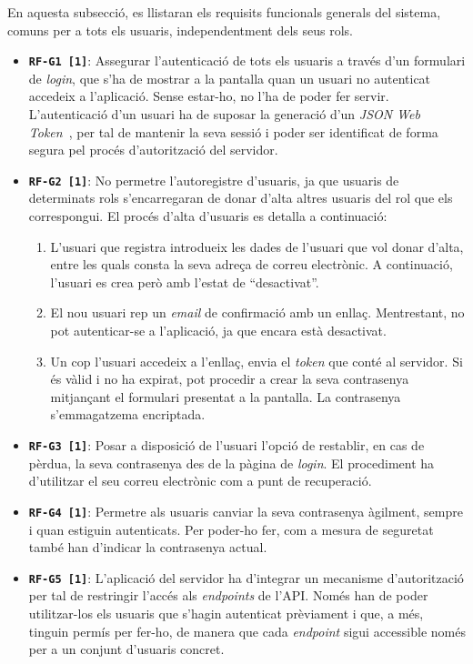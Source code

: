 \documentclass[a4paper,12pt]{ThesisStyle}
\begin{document}
En aquesta subsecció, es llistaran els requisits funcionals generals del sistema, comuns per a tots els usuaris, independentment dels seus rols.

\begin{itemize}
  \item \texttt{\textbf{RF-G1 [1]}}: Assegurar l'autenticació de tots els usuaris a través d'un formulari de \textit{login}, que s'ha de mostrar a la pantalla quan un usuari no autenticat accedeix a l'aplicació. Sense estar-ho, no l'ha de poder fer servir. L'autenticació d'un usuari ha de suposar la generació d'un \textit{JSON Web Token}~\cite{JWT}, per tal de mantenir la seva sessió i poder ser identificat de forma segura pel procés d'autorització del servidor.
  \item \texttt{\textbf{RF-G2 [1]}}: No permetre l'autoregistre d'usuaris, ja que usuaris de determinats rols s'encarregaran de donar d'alta altres usuaris del rol que els correspongui. El procés d'alta d'usuaris es detalla a continuació:
        \begin{enumerate}
          \item L'usuari que registra introdueix les dades de l'usuari que vol donar d'alta, entre les quals consta la seva adreça de correu electrònic. A continuació, l'usuari es crea però amb l'estat de ``desactivat''.
          \item El nou usuari rep un \textit{email} de confirmació amb un enllaç. Mentrestant, no pot autenticar-se a l'aplicació, ja que encara està desactivat.
          \item Un cop l'usuari accedeix a l'enllaç, envia el \textit{token} que conté al servidor. Si és vàlid i no ha expirat, pot procedir a crear la seva contrasenya mitjançant el formulari presentat a la pantalla. La contrasenya s'emmagatzema encriptada.
        \end{enumerate}
  \item \texttt{\textbf{RF-G3 [1]}}: Posar a disposició de l'usuari l'opció de restablir, en cas de pèrdua, la seva contrasenya des de la pàgina de \textit{login}. El procediment ha d'utilitzar el seu correu electrònic com a punt de recuperació.
  \item \texttt{\textbf{RF-G4 [1]}}: Permetre als usuaris canviar la seva contrasenya àgilment, sempre i quan estiguin autenticats. Per poder-ho fer, com a mesura de seguretat també han d'indicar la contrasenya actual.
  \item \texttt{\textbf{RF-G5 [1]}}: L'aplicació del servidor ha d'integrar un mecanisme d'autorització per tal de restringir l'accés als \textit{endpoints} de l'API. Només han de poder utilitzar-los els usuaris que s'hagin autenticat prèviament i que, a més, tinguin permís per fer-ho, de manera que cada \textit{endpoint} sigui accessible només per a un conjunt d'usuaris concret.

\end{itemize}
\end{document}
